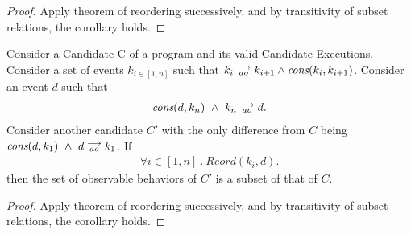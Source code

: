 \begin{proof}
    Apply theorem of reordering successively, and by transitivity of subset relations, the corollary holds.
\end{proof}

\begin{corollary}
    \label{CorollCodeMotion2}
    Consider a Candidate C of a program and its valid Candidate Executions.
    Consider a set of events $k_{i \in[1,n]}$ such that $k_i\stackrel{\longrightarrow}{_{ao}}k_{i+1} \wedge \textit{cons}(k_i,k_{i+1})$.
    Consider an event $d$ such that 
    \begin{align*}
        \textit{cons}(d,k_n) \ \wedge \ k_n\stackrel{\longrightarrow}{_{ao}}d.  
    \end{align*}
    Consider another candidate $C'$ with the only difference from $C$ being $\cons{d}{k_1} \ \wedge \ \reln{d}{ao}{k_1}$.
    If 
    \begin{align*}
        \forall i \in [1,n] \ . \ Reord(k_i,d).
    \end{align*} 
    then the set of observable behaviors of $C'$ is a subset of that of $C$. 
\end{corollary}

\begin{proof}
    Apply theorem of reordering successively, and by transitivity of subset relations, the corollary holds.
\end{proof}